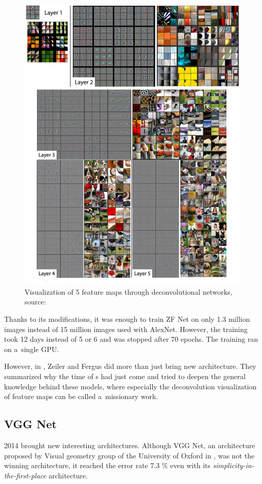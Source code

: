 \begin{figure}[H]
   \centering
	\includegraphics[width=0.79\linewidth]{./pictures/deconvnet.png}
	\caption[Deconvolutional network]{Visualization of 5 feature maps through 
	deconvolutional networks, source: \cite{zf-net}}
      \label{fig:deconvnet}
\end{figure}

Thanks to its modifications, it was enough to train ZF Net on only 1.3 million 
images instead of 15 million images used with AlexNet. However, the training 
took 12 days instead of 5 or 6 and was stopped after 70 epochs. The training
ran on a~single GPU.

However, in \cite{zf-net}, Zeiler and Fergus did more than just bring new 
architecture. They summarized why the time of s had just come and tried
to deepen the general knowledge behind these models, where especially the 
deconvolution visualization of feature maps can be called a~missionary work.

\subsection{VGG Net}
\label{vgg}

 2014 brought new interesting architectures. Although VGG Net, an 
architecture proposed by Visual geometry group of the University of Oxford in 
\cite{vgg}, was not the winning architecture, it reached the error rate 7.3 \% 
even with its \textit{simplicity-in-the-first-place} architecture.


